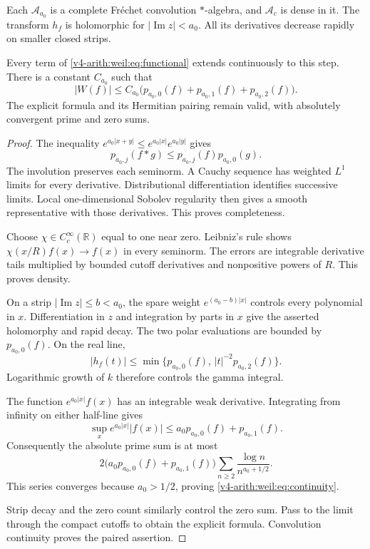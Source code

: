 \begin{theorem}
\label{v4-arith:weil:thm:extension}
Each \(\mathscr A_{a_0}\) is a complete Fr\'echet convolution
\(*\)-algebra, and \(\mathscr A_c\) is dense in it.
The transform \(h_f\) is holomorphic for
\(|\operatorname{Im}z|<a_0\). All its derivatives decrease rapidly
on smaller closed strips.

Every term of \eqref{v4-arith:weil:eq:functional} extends continuously
to this step. There is a constant \(C_{a_0}\) such that
\begin{equation}
 |W(f)|\le C_{a_0}
       \bigl(p_{a_0,0}(f)+p_{a_0,1}(f)+p_{a_0,2}(f)\bigr).
 \label{v4-arith:weil:eq:continuity}
\end{equation}
The explicit formula and its Hermitian pairing remain valid, with
absolutely convergent prime and zero sums.
\end{theorem}
\begin{proof}
The inequality \(e^{a_0|x+y|}\le e^{a_0|x|}e^{a_0|y|}\) gives
\[
 p_{a_0,j}(f*g)\le p_{a_0,j}(f)p_{a_0,0}(g).
\]
The involution preserves each seminorm. A Cauchy sequence has weighted
\(L^1\) limits for every derivative. Distributional differentiation
identifies successive limits. Local one-dimensional Sobolev regularity
then gives a smooth representative with those derivatives.
This proves completeness.

Choose \(\chi\in C_c^\infty(\mathbb R)\) equal to one near zero.
Leibniz's rule shows
\(\chi(x/R)f(x)\to f(x)\) in every seminorm.
The errors are integrable derivative tails multiplied by bounded
cutoff derivatives and nonpositive powers of \(R\).
This proves density.

On a strip \(|\operatorname{Im}z|\le b<a_0\), the spare weight
\(e^{(a_0-b)|x|}\) controls every polynomial in \(x\).
Differentiation in \(z\) and integration by parts in \(x\) give the
asserted holomorphy and rapid decay. The two polar evaluations are
bounded by \(p_{a_0,0}(f)\).
On the real line,
\[
 |h_f(t)|\le
 \min\{p_{a_0,0}(f),\,|t|^{-2}p_{a_0,2}(f)\}.
\]
Logarithmic growth of \(k\) therefore controls the gamma integral.

The function \(e^{a_0|x|}f(x)\) has an integrable weak derivative.
Integrating from infinity on either half-line gives
\[
 \sup_x e^{a_0|x|}|f(x)|
       \le a_0p_{a_0,0}(f)+p_{a_0,1}(f).
\]
Consequently the absolute prime sum is at most
\[
 2\bigl(a_0p_{a_0,0}(f)+p_{a_0,1}(f)\bigr)
           \sum_{n\ge2}\frac{\log n}{n^{a_0+1/2}}.
\]
This series converges because \(a_0>1/2\), proving
\eqref{v4-arith:weil:eq:continuity}.

Strip decay and the zero count similarly control the zero sum.
Pass to the limit through the compact cutoffs to obtain the explicit
formula. Convolution continuity proves the paired assertion.
\end{proof}

